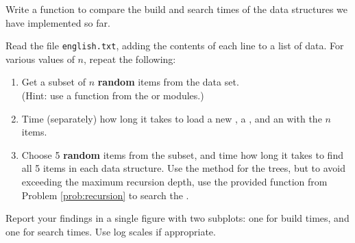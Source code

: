 \begin{problem} %
Write a function to compare the build and search times of the data structures we have implemented so far.

Read the file \texttt{english.txt}, adding the contents of each line to a list of data.
For various values of $n$, repeat the following:
%
\begin{enumerate}
\item Get a subset of $n$ \textbf{random} items from the data set.
\\(Hint: use a function from the  or  modules.)
\item Time (separately) how long it takes to load a new , a , and an  with the $n$ items.
\item Choose 5 \textbf{random} items from the subset, and time how long it takes to find all 5 items in each data structure.
Use the  method for the trees, but to avoid exceeding the maximum recursion depth, use the provided  function from Problem \ref{prob:recursion} to search the .
\end{enumerate}

Report your findings in a single figure with two subplots: one for build times, and one for search times.
Use log scales if appropriate.


\end{problem}
